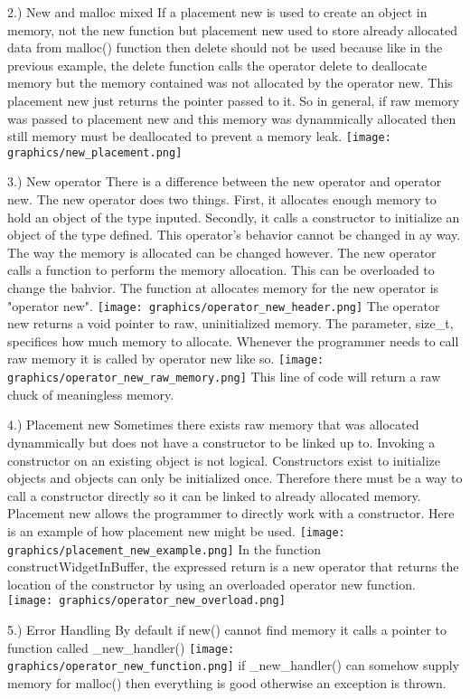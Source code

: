 \documentclass[letterpaper, 12pt]{article}
\begin{document}
2.) New and malloc mixed
	If a placement new is used to create an object in memory, not the new function but placement new used to store already allocated data from malloc() function then delete should not be used because like in the previous example, the delete function calls the operator delete to deallocate memory but the memory contained was not allocated by the operator new. This placement new just returns the pointer passed to it. So in general, if raw memory was passed to placement new and this memory was dynammically allocated then still memory must be deallocated to prevent a memory leak.
	\texttt{[image: graphics/new\_placement.png]}

3.) New operator
	There is a difference between the new operator and operator new. The new operator does two things.
	First, it allocates enough memory to hold an object of the type inputed. Secondly, it calls a constructor to initialize an object of the type defined. This operator's behavior cannot be changed in ay way. The way the memory is allocated can be changed however. The new operator calls a function to perform the memory allocation. This can be overloaded to change the bahvior. The function at allocates memory for the new operator is "operator new". 
	\texttt{[image: graphics/operator\_new\_header.png]}
	The operator new returns a void pointer to raw, uninitialized memory. The parameter, size_t, specifices how much memory to allocate. Whenever the programmer needs to call raw memory it is called by operator new like so.
	\texttt{[image: graphics/operator\_new\_raw\_memory.png]}
	This line of code will return a raw chuck of meaningless memory.

4.) Placement new
	Sometimes there exists raw memory that was allocated dynammically but does not have a constructor to be linked up to. Invoking a constructor on an existing object is not logical. Constructors exist to initialize objects and objects can only be initialized once. Therefore there must be a way to call a constructor directly so it can be linked to already allocated memory. Placement new allows the programmer to directly work with a constructor. Here is an example of how placement new might be used.
	\texttt{[image: graphics/placement\_new\_example.png]}
	In the function constructWidgetInBuffer, the expressed return is a new operator that returns the location of the constructor by using an overloaded operator new function.
	\texttt{[image: graphics/operator\_new\_overload.png]}

5.) Error Handling
	By default if new() cannot find memory it calls a pointer to function called _new_handler()
	\texttt{[image: graphics/operator\_new\_function.png]}
	if _new_handler() can somehow supply memory for malloc() then everything is good otherwise an exception is thrown.
\end{document}
